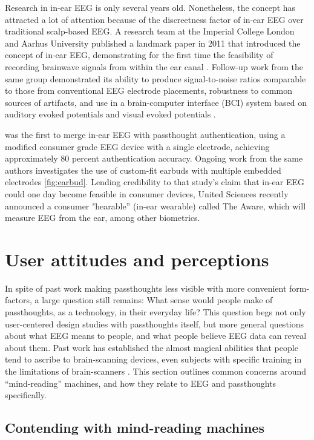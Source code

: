 \documentclass[sigconf]{acmart}
\begin{document}
Research in in-ear EEG is only several years old. Nonetheless, the concept has
attracted a lot of attention because of the discreetness factor of in-ear EEG over
traditional scalp-based EEG. A research team at the Imperial College London
and Aarhus University published a landmark paper in 2011 that introduced the
concept of in-ear EEG, demonstrating for the first time the feasibility of recording
brainwave signals from within the ear canal
\cite{Looney2011}.
Follow-up work from the same
group demonstrated its ability to produce signal-to-noise ratios comparable to
those from conventional EEG electrode placements, robustness to common
sources of artifacts, and use in a brain-computer interface (BCI) system based on
auditory evoked potentials and visual evoked potentials
\cite{Looney2012a,Kidmose2013a,Kidmose2013b}.

\cite{curranpassthoughts} was the first to merge in-ear EEG with passthought authentication,
 using a modified consumer grade EEG device with a single electrode, achieving approximately 80 percent authentication accuracy. 
Ongoing work from the same authors investigates the use of custom-fit earbuds with multiple embedded electrodes \ref{fig:earbud}.
Lending credibility to that study's claim that in-ear EEG could one day become feasible in consumer devices,
United Sciences recently announced a consumer "hearable'' (in-ear wearable) called The Aware, which will measure EEG from the ear, among other biometrics.

\section{User attitudes and perceptions}
\label{sec:org1e82386}

In spite of past work making passthoughts less visible with more convenient form-factors,
a large question still remains:
What sense would people make of passthoughts, as a technology, in their everyday life?
This question begs not only user-centered design studies with passthoughts itself,
but more general questions about what EEG means to people,
and what people believe EEG data can reveal about them.
Past work has established the almost magical abilities that people tend to ascribe to brain-scanning devices, even subjects with specific training in the limitations of brain-scanners \cite{Ali2014a}.
This section outlines common concerns around ``mind-reading'' machines, and how they relate to EEG and passthoughts specifically.

\subsection{Contending with mind-reading machines}
\label{sec:org6b82b47}
\end{document}
